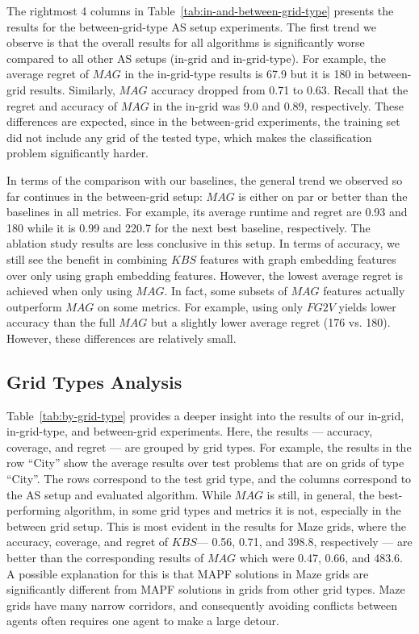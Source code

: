 \documentclass[letterpaper]{article} %
\newcommand{\fgtv}[1]{\ensuremath{\textit{FG2V}}\xspace}
\newcommand{\kaduri}[1]{\ensuremath{\textit{KBS}}\xspace}
\newcommand{\mapfgas}[1]{\ensuremath{\textit{MAG}}\xspace}
\begin{document}
The rightmost 4 columns in Table~\ref{tab:in-and-between-grid-type} presents the results for the between-grid-type AS setup experiments. 
The first trend we observe is that the overall results for all algorithms is significantly worse compared to all other AS setups (in-grid and in-grid-type). 
For example, the average regret of \mapfgas\ in the in-grid-type results is 67.9 but it is 180 in between-grid results. Similarly, \mapfgas\ accuracy dropped from 0.71 to 0.63. Recall that the regret and accuracy of \mapfgas\ in the in-grid
was 9.0 and 0.89, respectively. These differences are expected, since in the between-grid experiments, the training set did not include any grid of the tested type, which makes the classification problem significantly harder. 


In terms of the comparison with our baselines, the general trend we observed so far continues in the between-grid setup: \mapfgas\ is either on par or better than the baselines in all metrics. 
For example, its average runtime and regret are 0.93 and 180 while it is 0.99 and 220.7 for the next best baseline, respectively. 
The ablation study results are less conclusive in this setup. 
In terms of accuracy, we still see the benefit in combining \kaduri\ features with graph embedding features over only using graph embedding features. However, the lowest average regret is achieved when only using \mapfgas\ . In fact, some subsets of \mapfgas\ features actually outperform \mapfgas\ on some metrics. For example, using only \fgtv\ yields lower accuracy than the full \mapfgas\ but a slightly lower average regret (176 vs. 180). However, these differences are relatively small. 




\subsection{Grid Types Analysis}
Table~\ref{tab:by-grid-type} provides a deeper insight into the results of our in-grid, in-grid-type, and between-grid experiments. 
Here, the results --- accuracy, coverage, and regret --- are grouped by grid types. 
For example, the results in the row ``City'' show the average results over test problems that are on grids of type ``City''. 
The rows correspond to the test grid type, and the columns correspond to the AS setup and evaluated algorithm. 
While \mapfgas\ is still, in general, the best-performing algorithm, in some grid types and metrics it is not, especially in the between grid setup. 
This is most evident in the results for Maze grids, where the accuracy, coverage, and regret of \kaduri\ --- 0.56, 0.71, and 398.8, respectively --- are better than the corresponding results of \mapfgas\, which were 0.47, 0.66, and 483.6. 
A possible explanation for this is that MAPF solutions in Maze grids are significantly different from MAPF solutions in grids from other grid types. Maze grids have many narrow corridors, and consequently avoiding conflicts between agents often requires one agent to make a large detour. %
\end{document}
